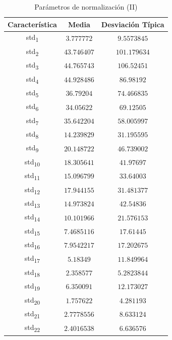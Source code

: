 \documentclass[12pt]{article}
\begin{document}
\begin{table}
	\caption{Parámetros de normalización (II)}
	\centering
		\begin{tabular}{||c c c||}
			\hline
			Característica & Media & Desviación Típica  \\ [0.5ex]
			\hline\hline
			std\textsubscript{1} & $3.777772$ & $9.5573845$ \\
			\hline
			std\textsubscript{2} & $43.746407$ & $101.179634$ \\
			\hline
			std\textsubscript{3} & $44.765743$ & $106.52451$ \\
			\hline
			std\textsubscript{4} & $44.928486$ & $86.98192$ \\
			\hline
			std\textsubscript{5} & $36.79204$ & $74.466835$ \\
			\hline
			std\textsubscript{6} & $34.05622$ & $69.12505$ \\
			\hline
			std\textsubscript{7} & $35.642204$ & $58.005997$ \\
			\hline
			std\textsubscript{8} & $14.239829$ & $31.195595$ \\
			\hline
			std\textsubscript{9} & $20.148722$ & $46.739002$ \\
			\hline
			std\textsubscript{10} & $18.305641$ & $41.97697$ \\
			\hline
			std\textsubscript{11} & $15.096799$ & $33.64003$ \\
			\hline
			std\textsubscript{12} & $17.944155$ & $31.481377$ \\
			\hline
			std\textsubscript{13} & $14.973824$ & $42.54836$ \\
			\hline
			std\textsubscript{14} & $10.101966$ & $21.576153$ \\
			\hline
			std\textsubscript{15} & $7.4685116$ & $17.61445$ \\
			\hline
			std\textsubscript{16} & $7.9542217$ & $17.202675$ \\
			\hline
			std\textsubscript{17} & $5.18349$ & $11.849964$ \\
			\hline
			std\textsubscript{18} & $2.358577$ & $5.2823844$ \\
			\hline
			std\textsubscript{19} & $6.350091$ & $12.173027$ \\
			\hline
			std\textsubscript{20} & $1.757622$ & $4.281193$ \\
			\hline
			std\textsubscript{21} & $2.7778556$ & $8.633124$ \\
			\hline
			std\textsubscript{22} & $2.4016538$ & $6.636576$ \\

\end{tabular}
\end{table}
\end{document}
